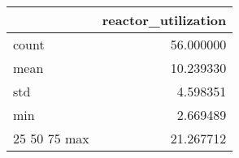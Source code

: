 \begin{tabular}{lr}
\toprule
 & reactor\_utilization \\
\midrule
count & 56.000000 \\
mean & 10.239330 \\
std & 4.598351 \\
min & 2.669489 \\
25%
50%
75%
max & 21.267712 \\
\bottomrule
\end{tabular}

